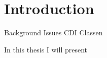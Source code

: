 \chapter{Introduction}
Background
Issues CDI
Classen

\cleardoublepage
In this thesis I will present

\cleardoublepage
